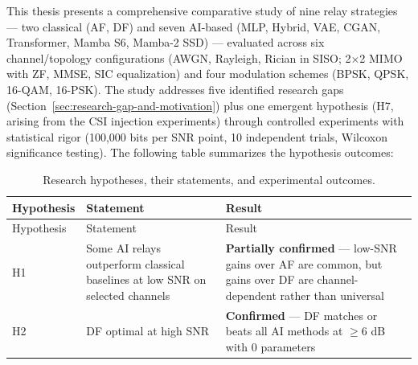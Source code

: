 This thesis presents a comprehensive comparative study of nine relay strategies --- two classical (AF, DF) and seven AI-based (MLP, Hybrid, VAE, CGAN, Transformer, Mamba S6, Mamba-2 SSD) --- evaluated across six channel/topology configurations (AWGN, Rayleigh, Rician in SISO; 2×2 MIMO with ZF, MMSE, SIC equalization) and four modulation schemes (BPSK, QPSK, 16-QAM, 16-PSK). The study addresses five identified research gaps (Section~\ref{sec:research-gap-and-motivation}) plus one emergent hypothesis (H7, arising from the CSI injection experiments) through controlled experiments with statistical rigor (100,000 bits per SNR point, 10 independent trials, Wilcoxon significance testing). The following table summarizes the hypothesis outcomes:

\begin{longtable}[]{@{}
  >{\raggedright\arraybackslash}p{}
  >{\raggedright\arraybackslash}p{}
  >{\raggedright\arraybackslash}p{}@{}}
\caption{Research hypotheses, their statements, and experimental outcomes.}\label{tbl:table33}\tabularnewline
\toprule\noalign{}
\begin{minipage}[b]{\linewidth}\raggedright
Hypothesis
\end{minipage} & \begin{minipage}[b]{\linewidth}\raggedright
Statement
\end{minipage} & \begin{minipage}[b]{\linewidth}\raggedright
Result
\end{minipage} \\
\midrule\noalign{}
\endfirsthead
\toprule\noalign{}
\begin{minipage}[b]{\linewidth}\raggedright
Hypothesis
\end{minipage} & \begin{minipage}[b]{\linewidth}\raggedright
Statement
\end{minipage} & \begin{minipage}[b]{\linewidth}\raggedright
Result
\end{minipage} \\
\midrule\noalign{}
\endhead
\bottomrule\noalign{}
\endlastfoot
H1 & Some AI relays outperform classical baselines at low SNR on selected channels & \textbf{Partially confirmed} --- low-SNR gains over AF are common, but gains over DF are channel-dependent rather than universal \\
H2 & DF optimal at high SNR & \textbf{Confirmed} --- DF matches or beats all AI methods at \(\geq 6\) dB with 0 parameters \\

\end{longtable}
